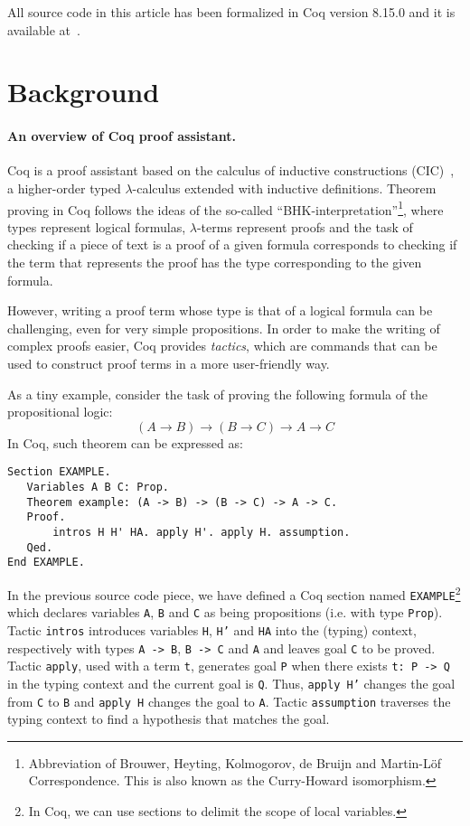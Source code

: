 \documentclass[sigconf]{acmart}
\begin{document}
All source code in this article has been formalized in Coq version 8.15.0 and it
is available at~\cite{modal-coq-lib}.

\section{Background}\label{sec:background}

\paragraph{An overview of Coq proof assistant.}

Coq is a proof assistant based on the calculus of inductive
constructions (CIC)~\cite{manual_cic}, a higher-order typed
$\lambda$-calculus extended with inductive definitions.  Theorem
proving in Coq follows the ideas of the so-called
``BHK-in\-ter\-pre\-ta\-tion''\footnote{Abbreviation of Brouwer, Heyting,
  Kolmogorov, de Bruijn and Martin-L\"of Correspondence. This is also
  known as the Curry-Howard isomorphism.}, where types represent
logical formulas, $\lambda$-terms represent proofs
\cite{Bertot10} and the task of checking if a piece of text is a
proof of a given formula corresponds to checking if the term that
represents the proof has the type corresponding to the given formula.

However, writing a proof term whose type is that of a logical formula
can be challenging, even for very simple propositions.  In order to
make the writing of complex proofs easier, Coq provides
\emph{tactics}, which are commands that can be used to construct proof
terms in a more user-friendly way.

As a tiny example, consider the task of proving the following 
formula of the propositional logic:
\[
(A \to B)\to (B\to C) \to A \to C
\]
In Coq, such theorem can be expressed as:
\begin{verbatim}
Section EXAMPLE.
   Variables A B C: Prop.
   Theorem example: (A -> B) -> (B -> C) -> A -> C.
   Proof.
       intros H H' HA. apply H'. apply H. assumption. 
   Qed.
End EXAMPLE.
\end{verbatim}
In the previous source code piece, we have defined a Coq section named
\texttt{EXAMPLE}\footnote{In Coq, we can use sections to delimit the
  scope of local variables.} which declares variables \texttt{A},
\texttt{B} and \texttt{C} as being propositions (i.e. with type
\texttt{Prop}). Tactic \texttt{intros} introduces variables
\texttt{H}, \texttt{H'} and \texttt{HA} into the (typing) context,
respectively with types \texttt{A -> B}, \texttt{B -> C} and
\texttt{A} and leaves goal \texttt{C} to be proved. Tactic
\texttt{apply}, used with a term \texttt{t}, generates goal
\texttt{P}
when there exists \texttt{t: P -> Q} in the typing context and the
current goal is \texttt{Q}. Thus, \texttt{apply H'} changes the goal
from \texttt{C} to \texttt{B} and \texttt{apply H}
changes the goal to \texttt{A}. Tactic \texttt{assumption}
traverses the typing context to find a hypothesis that matches the goal.
\end{document}

